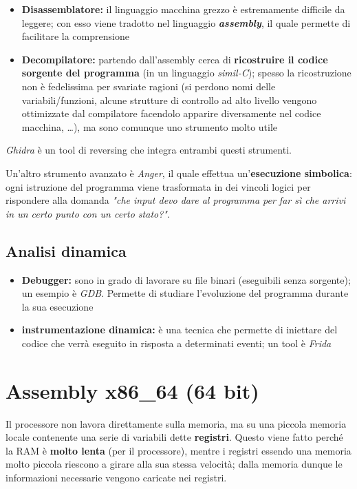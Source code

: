 \begin{itemize}
    \item \textbf{Disassemblatore:} il linguaggio macchina grezzo è estremamente difficile da leggere; con esso 
    viene tradotto nel linguaggio \textbf{\textit{assembly}}, il quale permette di facilitare
    la comprensione
    \item \textbf{Decompilatore:} partendo dall'assembly cerca di \textbf{ricostruire il codice 
    sorgente del programma} (in un linguaggio \textit{simil-C}); spesso la ricostruzione non è 
    fedelissima per svariate ragioni (si perdono nomi delle variabili/funzioni, alcune strutture di controllo ad alto livello 
    vengono ottimizzate dal compilatore facendolo apparire diversamente nel codice macchina, \dots), ma 
    sono comunque uno strumento molto utile
\end{itemize}
\textit{Ghidra} è un tool di reversing che integra entrambi questi strumenti.

Un'altro strumento avanzato è \textit{Anger}, il quale effettua un'\textbf{esecuzione simbolica}: ogni
istruzione del programma viene trasformata in dei vincoli logici per rispondere alla domanda
\textit{"che input devo dare al programma per far sì che arrivi in un certo punto con
un certo stato?"}.


\subsection{Analisi dinamica}

\begin{itemize}
    \item \textbf{Debugger:} sono in grado di lavorare su file binari (eseguibili senza sorgente);
    un esempio è \textit{GDB}. Permette di studiare l'evoluzione del programma durante la sua esecuzione
    \item \textbf{instrumentazione dinamica:} è una tecnica che permette di iniettare del codice
    che verrà eseguito in risposta a determinati eventi; un tool è \textit{Frida} 
\end{itemize}

\section{Assembly x86\_64 (64 bit)}

Il processore non lavora direttamente sulla memoria, ma su una piccola memoria locale
contenente una serie di variabili dette \textbf{registri}. Questo viene fatto perché la
RAM è \textbf{molto lenta} (per il processore), mentre i registri essendo una memoria molto piccola
riescono a girare alla sua stessa velocità; dalla memoria dunque le informazioni
necessarie vengono caricate nei registri.

